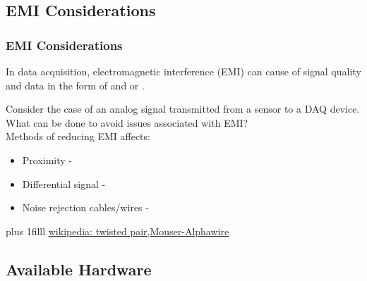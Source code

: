 \documentclass[fleqn]{beamer} %
\newcommand{\sectionIIsubsectionIItitle}{EMI Considerations}
\newcommand{\sectionIIsubsectionIIItitle}{Available Hardware}
\newcommand{\btVFill}{\vskip0pt plus 1filll}
\begin{document}
		\subsection{\sectionIIsubsectionIItitle}\label{sectionIIsubsectionII}

			\begin{frame}
				\frametitle{\sectionIIsubsectionIItitle} \scriptsize
	
				\bigskip

				In data acquisition, electromagnetic interference (EMI) can cause \underline{\hspace{20mm}} of signal quality and data \underline{\hspace{20mm}} in the form of \underline{\hspace{20mm}} and or \underline{\hspace{20mm}}. \vspace{10mm}

				Consider the case of an analog signal transmitted from a sensor to a DAQ device. What can be done to avoid issues associated with EMI?  \vspace{5mm}\\

				Methods of reducing EMI affects:
				\begin{itemize}
					\item Proximity - 

					\item Differential signal - 

					\item Noise rejection cables/wires -

				\end{itemize}


				\btVFill
				\tiny{\href{https://en.wikipedia.org/wiki/Twisted_pair}{wikipedia: twisted pair,}\href{https://www.mouser.com/pdfdocs/alphawire-Understanding-Shielded-Cable.pdf}{Mouser-Alphawire}}		
			\end{frame}

		\subsection{\sectionIIsubsectionIIItitle}\label{sectionIIsubsectionIII}
\end{document}
